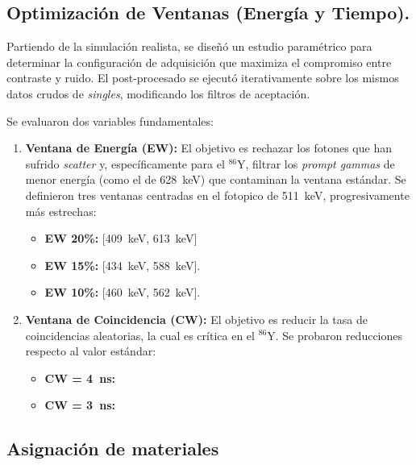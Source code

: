 \subsection{ Optimización de Ventanas (Energía y Tiempo).}
\label{subsec:fase4}

Partiendo de la simulación realista, se diseñó un estudio paramétrico para determinar la configuración de adquisición que maximiza el compromiso entre contraste y ruido. El post-procesado se ejecutó iterativamente sobre los mismos datos crudos de \textit{singles}, modificando los filtros de aceptación.

Se evaluaron dos variables fundamentales:

\begin{enumerate}
  \item \textbf{Ventana de Energía (EW):} El objetivo es rechazar los fotones que han sufrido \textit{scatter} y, específicamente para el $^{86}\text{Y}$, filtrar los \textit{prompt gammas} de menor energía (como el de \SI{628}{\kilo\electronvolt}) que contaminan la ventana estándar. Se definieron tres ventanas centradas en el fotopico de \SI{511}{\kilo\electronvolt}, progresivamente más estrechas:
        \begin{itemize}
          \item \textbf{EW 20\%:} [\SI{409}{\kilo\electronvolt}, \SI{613}{\kilo\electronvolt}]
          \item \textbf{EW 15\%:} [\SI{434}{\kilo\electronvolt}, \SI{588}{\kilo\electronvolt}].
          \item \textbf{EW 10\%:} [\SI{460}{\kilo\electronvolt}, \SI{562}{\kilo\electronvolt}].
        \end{itemize}

  \item \textbf{Ventana de Coincidencia (CW):} El objetivo es reducir la tasa de coincidencias aleatorias, la cual es crítica en el $^{86}\text{Y}$. Se probaron reducciones respecto al valor estándar:
        \begin{itemize}
          \item \textbf{CW = \SI{4}{\nano\second}:}
          \item \textbf{CW = \SI{3}{\nano\second}:}
        \end{itemize}
\end{enumerate}

\subsection*{Asignación de materiales }

